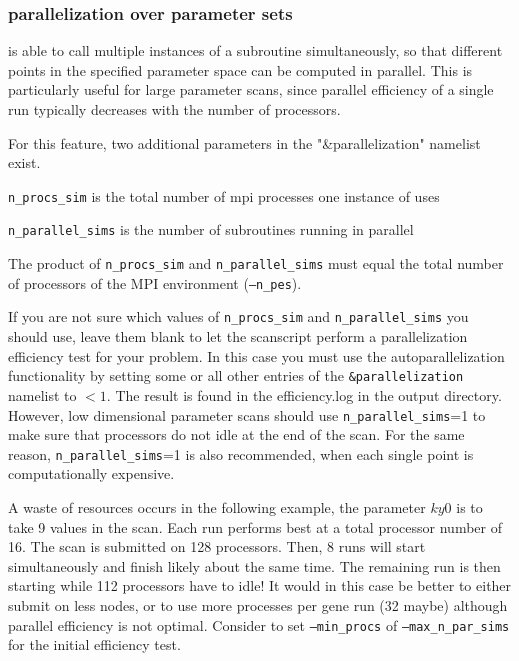 \documentclass[12pt]{article}
\begin{document}
\subsubsection{\gene parallelization over parameter sets}

\label{sec:scangene}
\gene is able to call multiple instances of a \gene subroutine
simultaneously, so that different points in the specified parameter space can be 
computed in parallel. This is particularly useful for large parameter
scans, since parallel efficiency of a single \gene run typically
decreases with the number of processors.

For this feature, two additional parameters in the "\&parallelization"
namelist exist.

\texttt{n\_procs\_sim} is the total number of mpi processes one
instance of \gene uses

\texttt{n\_parallel\_sims} is the number of \gene subroutines running in
parallel

The product of \texttt{n\_procs\_sim} and
\texttt{n\_parallel\_sims} must equal the total number of processors of
the MPI environment (\texttt{--n\_pes}).

If you are not sure which values of \texttt{n\_procs\_sim} and
\texttt{n\_parallel\_sims} you should use, leave them blank to let the
scanscript perform a parallelization efficiency test for your problem.
In this case you must use the autoparallelization functionality by
setting some or all other entries of the \texttt{\&parallelization} namelist to $<1$.
The result is found in the efficiency.log in the output directory.
However, low dimensional parameter scans should use
\texttt{n\_parallel\_sims}=1 to make sure that processors do not idle at
the end of the scan. For the same reason, \texttt{n\_parallel\_sims}=1
is also recommended, when each single point is computationally
expensive.

A waste of resources occurs in the following example, the parameter $ky0$ is to take 9 values in the scan.
Each run performs best at a total processor number of 16. The scan is submitted on 128 processors.
Then, 8 runs will start simultaneously and finish likely about the same time.
The remaining run is then starting while 112 processors have to idle!
It would in this case be better to either submit on less nodes, or to use more processes per gene run (32 maybe)
although parallel efficiency is not optimal. 
Consider to set  \texttt{--min\_procs} of \texttt{--max\_n\_par\_sims} for the initial efficiency test.
\end{document}
